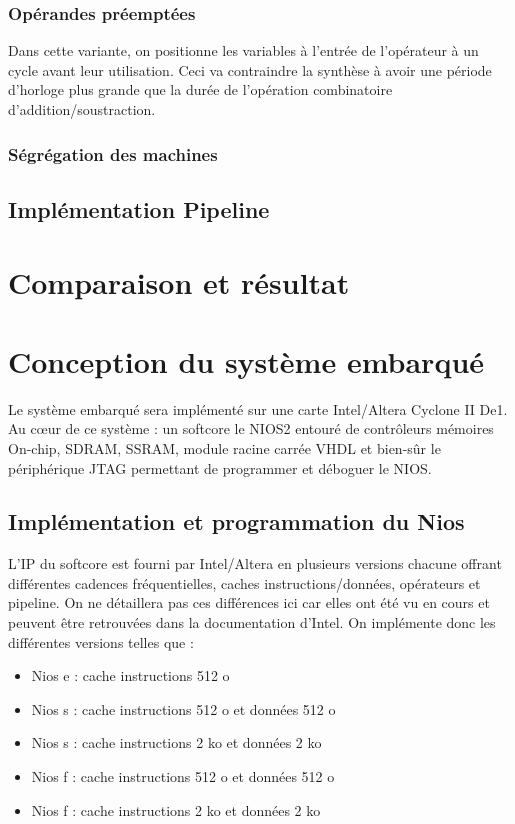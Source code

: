 \documentclass[12pt,a4paper]{article}
\begin{document}
\subsubsection{Opérandes préemptées}
Dans cette variante, on positionne les variables à l'entrée de l'opérateur à un cycle avant leur utilisation. Ceci va contraindre la synthèse à avoir une période d'horloge plus grande que la durée de l'opération combinatoire d'addition/soustraction.

\subsubsection{Ségrégation des machines} %

\subsection{Implémentation Pipeline} %

\section{Comparaison et résultat}

\section{Conception du système embarqué} %
Le système embarqué sera implémenté sur une carte Intel/Altera Cyclone II De1. Au cœur de ce système : un softcore le NIOS2 entouré de contrôleurs mémoires On-chip, SDRAM, SSRAM, module racine carrée VHDL et bien-sûr le périphérique JTAG permettant de programmer et déboguer le NIOS.
\subsection{Implémentation et programmation du Nios}
L'IP du softcore est fourni par Intel/Altera en plusieurs versions chacune offrant différentes cadences fréquentielles, caches instructions/données, opérateurs et pipeline. On ne détaillera pas ces différences ici car elles ont été vu en cours et peuvent être retrouvées dans la documentation d'Intel. On implémente donc les différentes versions telles que :
\begin{itemize}
\item Nios e : cache instructions 512 o
\item Nios s : cache instructions 512 o et données 512 o
\item Nios s : cache instructions 2 ko et données 2 ko
\item Nios f : cache instructions 512 o et données 512 o
\item Nios f : cache instructions 2 ko et données 2 ko
\end{itemize}
\end{document}
